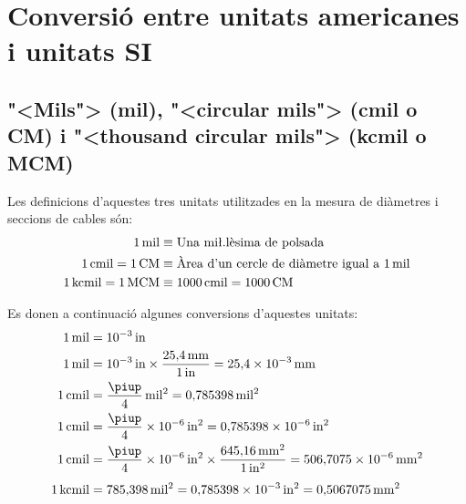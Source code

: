 \section{Conversi\'{o} entre unitats americanes i unitats SI}

\subsection{{"<}Mils{">} (mil), {"<}circular mils{">} (cmil o CM) i {"<}thousand circular mils{">} (kcmil o MCM)}\label{sec:MCM}
  

  Les definicions d'aquestes tres unitats utilitzades en la mesura de di\`{a}metres i seccions de cables s\'{o}n:
\begin{align}
  1\unit{mil} &\equiv \text{Una mi{\l.l}\`{e}sima de polsada} \\
  1\unit{cmil} = 1\unit{CM} &\equiv  \text{\`{A}rea d'un cercle de di\`{a}metre igual a 1\unit{mil}} \\
  1\unit{kcmil} = 1\unit{MCM} &\equiv 1000\unit{cmil} = 1000\unit{CM}
\end{align}

  Es donen a continuaci\'{o} algunes conversions d'aquestes unitats:
\begin{align}
   1\unit{mil} &= 10^{-3}\unit{in}  \\
  1\unit{mil} &= 10^{-3}\unit{in} \times \frac{25{,}4\unit{mm}}{1\unit{in}} = 25{,}4 \times 10^{-3}\unit{mm}  \\
  1\unit{cmil} &= \frac{\piup}{4}\unit{mil^2} = 0{,}785398\unit{mil^2}   \\
   1\unit{cmil} &= \frac{\piup}{4}\times 10^{-6}\unit{in^2} = 0{,}785398\times 10^{-6}\unit{in^2} \\
   1\unit{cmil} &= \frac{\piup}{4} \times 10^{-6}\unit{in^2} \times \frac{645{,}16\unit{mm^2}}{1\unit{in^2}} = 506{,}7075\times 10^{-6}\unit{mm^2}
   \\[1ex]
   1\unit{kcmil} &= 785{,}398\unit{mil^2}  = 0{,}785398\times 10^{-3}\unit{in^2} = 0{,}5067075\unit{mm^2}
\end{align}

